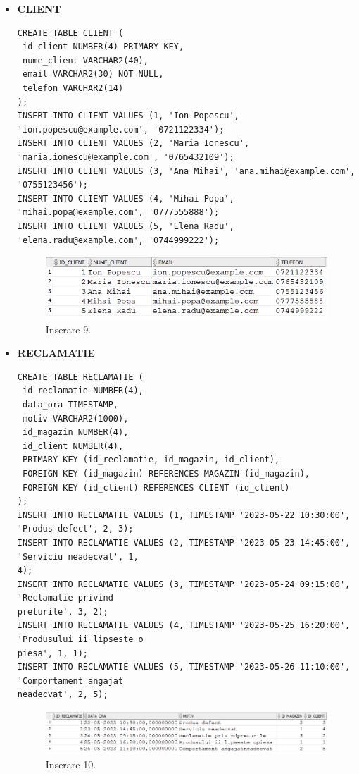 \begin{itemize}
    \item \textbf{CLIENT}
    \vspace{0.2cm}
    \begin{lstlisting}
CREATE TABLE CLIENT (
 id_client NUMBER(4) PRIMARY KEY,
 nume_client VARCHAR2(40),
 email VARCHAR2(30) NOT NULL,
 telefon VARCHAR2(14)
);
INSERT INTO CLIENT VALUES (1, 'Ion Popescu', 'ion.popescu@example.com', '0721122334');
INSERT INTO CLIENT VALUES (2, 'Maria Ionescu', 'maria.ionescu@example.com', '0765432109');
INSERT INTO CLIENT VALUES (3, 'Ana Mihai', 'ana.mihai@example.com', '0755123456');
INSERT INTO CLIENT VALUES (4, 'Mihai Popa', 'mihai.popa@example.com', '0777555888');
INSERT INTO CLIENT VALUES (5, 'Elena Radu', 'elena.radu@example.com', '0744999222');
    \end{lstlisting}
    \vspace{0.2cm}
    \begin{figure}[h]
      \centerline{\includegraphics{images/inserare9.png}}
      \caption{ Inserare 9.}
    \end{figure}
    \vspace{0.5cm}

    \item \textbf{RECLAMATIE}
    \vspace{0.2cm}
    \begin{lstlisting}
CREATE TABLE RECLAMATIE (
 id_reclamatie NUMBER(4),
 data_ora TIMESTAMP,
 motiv VARCHAR2(1000),
 id_magazin NUMBER(4),
 id_client NUMBER(4),
 PRIMARY KEY (id_reclamatie, id_magazin, id_client),
 FOREIGN KEY (id_magazin) REFERENCES MAGAZIN (id_magazin),
 FOREIGN KEY (id_client) REFERENCES CLIENT (id_client)
);
INSERT INTO RECLAMATIE VALUES (1, TIMESTAMP '2023-05-22 10:30:00', 'Produs defect', 2, 3);
INSERT INTO RECLAMATIE VALUES (2, TIMESTAMP '2023-05-23 14:45:00', 'Serviciu neadecvat', 1,
4);
INSERT INTO RECLAMATIE VALUES (3, TIMESTAMP '2023-05-24 09:15:00', 'Reclamatie privind
preturile', 3, 2);
INSERT INTO RECLAMATIE VALUES (4, TIMESTAMP '2023-05-25 16:20:00', 'Produsului ii lipseste o
piesa', 1, 1);
INSERT INTO RECLAMATIE VALUES (5, TIMESTAMP '2023-05-26 11:10:00', 'Comportament angajat
neadecvat', 2, 5);
    \end{lstlisting}
    \vspace{0.2cm}
    \begin{figure}[h]
      \centerline{\includegraphics{images/inserare10.png}}
      \caption{ Inserare 10.}
    \end{figure}
    \vspace{0.5cm}


\end{itemize}
